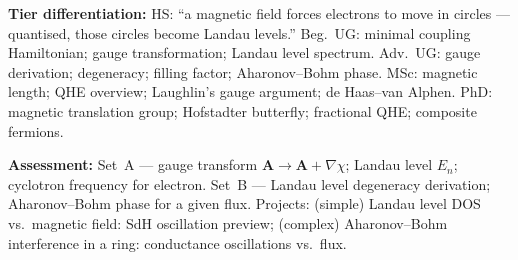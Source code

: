 \documentclass[11pt,a4paper]{article}
\begin{document}
\begin{tcolorbox}[modulebox, title={Module~I.4 / L05: Minimal Coupling Hamiltonian and Landau Levels}]
\medskip\textbf{Tier differentiation:}
HS: ``a magnetic field forces electrons to move in circles --- quantised, those circles become Landau levels.''
Beg.\ UG: minimal coupling Hamiltonian; gauge transformation; Landau level spectrum.
Adv.\ UG: gauge derivation; degeneracy; filling factor; Aharonov--Bohm phase.
MSc: magnetic length; QHE overview; Laughlin's gauge argument; de Haas--van Alphen.
PhD: magnetic translation group; Hofstadter butterfly; fractional QHE; composite fermions.

\medskip\textbf{Assessment:}
Set~A --- gauge transform $\mathbf{A}\to\mathbf{A}+\nabla\chi$; Landau level $E_n$; cyclotron frequency for electron.
Set~B --- Landau level degeneracy derivation; Aharonov--Bohm phase for a given flux.
Projects: (simple) Landau level DOS vs.\ magnetic field: SdH oscillation preview;
(complex) Aharonov--Bohm interference in a ring: conductance oscillations vs.\ flux.
\end{tcolorbox}

\medskip
\end{document}
